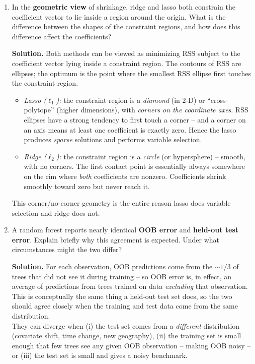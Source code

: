 \documentclass[11pt]{article}
\newcommand{\solution}[1]{%
  \par\medskip\noindent\textbf{Solution.} #1\par\medskip
}
\begin{document}
\begin{enumerate}[leftmargin=*]

\item In the \textbf{geometric view} of shrinkage, ridge and lasso both constrain the coefficient vector to lie inside a region around the origin. What is the difference between the shapes of the constraint regions, and how does this difference affect the coefficients?

\solution{Both methods can be viewed as minimizing RSS subject to the coefficient vector lying inside a constraint region. The contours of RSS are ellipses; the optimum is the point where the smallest RSS ellipse first touches the constraint region.
\begin{itemize}
\item \emph{Lasso ($\ell_1$):} the constraint region is a \emph{diamond} (in 2-D) or ``cross-polytope'' (higher dimensions), with \emph{corners on the coordinate axes}. RSS ellipses have a strong tendency to first touch a corner -- and a corner on an axis means at least one coefficient is exactly zero. Hence the lasso produces \emph{sparse} solutions and performs variable selection.
\item \emph{Ridge ($\ell_2$):} the constraint region is a \emph{circle} (or hypersphere) -- smooth, with no corners. The first contact point is essentially always somewhere on the rim where \emph{both} coefficients are nonzero. Coefficients shrink smoothly toward zero but never reach it.
\end{itemize}
This corner/no-corner geometry is the entire reason lasso does variable selection and ridge does not.}

\item A random forest reports nearly identical \textbf{OOB error} and \textbf{held-out test error}. Explain briefly why this agreement is expected. Under what circumstances might the two differ?

\solution{For each observation, OOB predictions come from the $\sim 1/3$ of trees that did not see it during training -- so OOB error is, in effect, an average of predictions from trees trained on data \emph{excluding} that observation. This is conceptually the same thing a held-out test set does, so the two should agree closely when the training and test data come from the same distribution.\\
They can diverge when (i) the test set comes from a \emph{different} distribution (covariate shift, time change, new geography), (ii) the training set is small enough that few trees see any given OOB observation -- making OOB noisy -- or (iii) the test set is small and gives a noisy benchmark.}


\end{enumerate}
\end{document}
